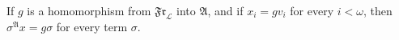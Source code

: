 If $g$ is a homomorphism from $\mathfrak{Fr}_\mathcal{L}$ into $\mathfrak{A}$, and if $x_i = gv_i$ for every $i < \omega$, then $\sigma^{\mathfrak{A}}x = g\sigma$ for every term $\sigma$.
